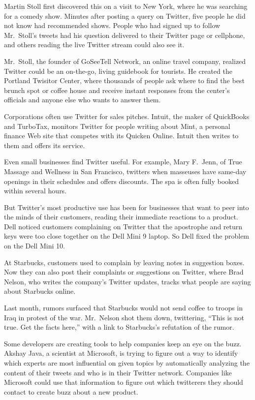\documentclass[12pt,a4paper,onecolumn]{article}
\begin{document}
Martin Stoll first discovered this on a visit to New York, where he was searching for a comedy show.
Minutes after posting a query on Twitter, five people he did not know had recommended shows. People
who had signed up to follow Mr.~Stoll's tweets had his question delivered to their Twitter page or
cellphone, and others reading the live Twitter stream could also see it.

Mr.~Stoll, the founder of GoSeeTell Network, an online travel company, realized Twitter could be an
on-the-go, living guidebook for tourists. He created the Portland Twisitor Center, where thousands
of people ask where to find the best brunch spot or coffee house and receive instant responses from
the center's officials and anyone else who wants to answer them.

Corporations often use Twitter for sales pitches. Intuit, the maker of QuickBooks and TurboTax,
monitors Twitter for people writing about Mint, a personal finance Web site that competes with its
Quicken Online. Intuit then writes to them and offers its service.

Even small businesses find Twitter useful. For example, Mary F.~Jenn, of True Massage and Wellness
in San Francisco, twitters when masseuses have same-day openings in their schedules and offers
discounts. The spa is often fully booked within several hours.

But Twitter's most productive use has been for businesses that want to peer into the minds of their
customers, reading their immediate reactions to a product. Dell noticed customers complaining on
Twitter that the apostrophe and return keys were too close together on the Dell Mini 9 laptop. So
Dell fixed the problem on the Dell Mini 10.

At Starbucks, customers used to complain by leaving notes in suggestion boxes. Now they can also
post their complaints or suggestions on Twitter, where Brad Nelson, who writes the company's Twitter
updates, tracks what people are saying about Starbucks online.

Last month, rumors surfaced that Starbucks would not send coffee to troops in Iraq in protest of the
war. Mr.~Nelson shot them down, twittering, ``This is not true. Get the facts here,'' with a link to
Starbucks's refutation of the rumor.

Some developers are creating tools to help companies keep an eye on the buzz. Akshay Java, a
scientist at Microsoft, is trying to figure out a way to identify which experts are most influential
on given topics by automatically analyzing the content of their tweets and who is in their Twitter
network. Companies like Microsoft could use that information to figure out which twitterers they
should contact to create buzz about a new product.
\end{document}
